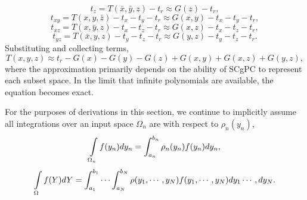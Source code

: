 \begin{equation}
  t_z = T(\bar x, \bar y, z) - t_r \approx G(z) - t_r,
\end{equation}
\begin{equation}
  t_{xy} = T(x, y, \bar z) - t_x - t_y - t_r \approx G(x,y) - t_x - t_y - t_r,
\end{equation}
\begin{equation}
  t_{xz} = T(x, \bar y, z) - t_x - t_z - t_r \approx G(x,z) - t_x - t_z - t_r,
\end{equation}
\begin{equation}
  t_{yz} = T(\bar x, y, z) - t_y - t_z - t_r \approx G(y,z) - t_y - t_z - t_r.
\end{equation}
Substituting and collecting terms,
\begin{equation}\label{eq:simplehdmr}
  T(x,y,z) \approx t_r - G(x) - G(y) - G(z) + G(x,y) + G(x,z) + G(y,z),
\end{equation}
where the approximation primarily depends on the ability of SCgPC to
represent each subset space.  In the limit that infinite polynomials are available, the equation becomes
exact.

For the purposes of derivations in this section, we continue to implicitly assume all integrations over an input
space $\Omega_n$ are with respect to $\rho_n(y_n)$,
\begin{equation}
  \int\limits_{\Omega_n} f(y_n) dy_n = \int_{a_n}^{b_n} \rho_n(y_n) f(y_n) dy_n,
\end{equation}
\begin{equation}
  \int\limits_{\Omega} f(Y) dY = \int_{a_1}^{b_1}\cdots\int_{a_N}^{b_N} \rho(y_1,\cdots,y_N) f(y_1,\cdots,y_N) dy_1\cdots,dy_N.
\end{equation}

